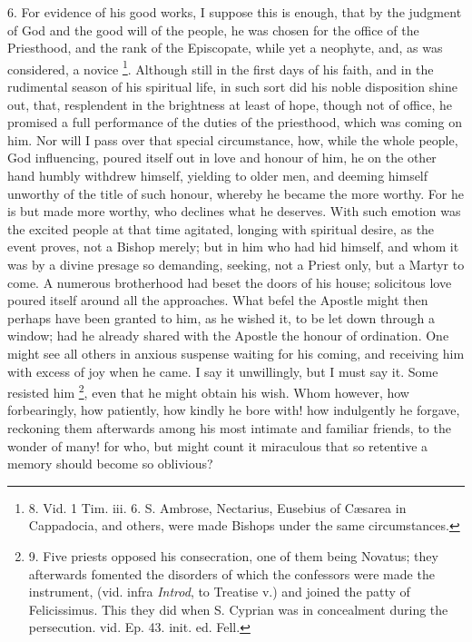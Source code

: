 6. For evidence of his good works, I suppose this is enough, that by
the judgment of God and the good will of the people, he was chosen for
the office of the Priesthood, and the rank of the Episcopate, while
yet a neophyte, and, as was considered, a novice \footnote{8. Vid. 1
Tim. iii. 6. S. Ambrose, Nectarius, Eusebius of Cæsarea in Cappadocia,
and others, were made Bishops under the same circumstances.}. Although still in the first days of his faith, and in the
rudimental season of his spiritual life, in such sort did his noble
disposition shine out, that, resplendent in the brightness at least of
hope, though not of office, he promised a full performance of the
duties of the priesthood, which was coming on him. Nor will I pass
over that special circumstance, how, while the whole people, God
influencing, poured itself out in love and honour of him, he on the
other hand humbly withdrew himself, yielding to older men, and deeming
himself unworthy of the title of such honour, whereby he became the
more worthy. For he is but made more worthy, who declines what he
deserves. With such emotion was the excited people at that time
agitated, longing with spiritual desire, as the event proves, not a
Bishop merely; but in him who had hid himself, and whom it was by a
divine presage so demanding, seeking, not a Priest only, but a Martyr
to come. A numerous brotherhood had beset the doors of his house;
solicitous love poured itself around all the approaches. What befel
the Apostle might then perhaps have been granted to him, as he wished
it, to be let down through a window; had he already shared with the
Apostle the honour of ordination. One might see all others in
anxious suspense waiting for his coming, and receiving him with excess
of joy when he came. I say it unwillingly, but I must say it. Some
resisted him \footnote{9. Five
priests opposed his consecration, one of them being Novatus; they
afterwards fomented the disorders of which the confessors were made
the instrument, (vid. infra \emph{Introd}, to Treatise v.) and joined
the patty of Felicissimus. This they did when S. Cyprian was in
concealment during the persecution. vid. Ep. 43. init. ed. Fell.}, even that
he might obtain his wish. Whom however, how forbearingly, how
patiently, how kindly he bore with! how indulgently he forgave,
reckoning them afterwards among his most intimate and familiar
friends, to the wonder of many! for who, but might count it miraculous
that so retentive a memory should become so oblivious?

